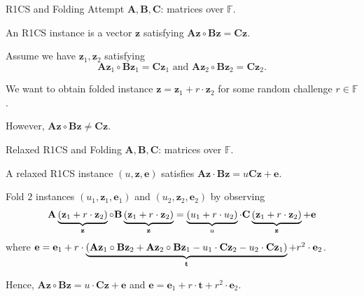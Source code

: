 \begin{frame}{R1CS and Folding Attempt}
	$\mathbf{A}, \mathbf{B}, \mathbf{C}$: matrices over $\mathbb{F}$.
	
	An R1CS instance is a vector $\mathbf{z}$ satisfying $\mathbf{A}\mathbf{z}\circ\mathbf{B}\mathbf{z} = \mathbf{C}\mathbf{z}$.
	
	Assume we have $\mathbf{z}_1, \mathbf{z}_2$ satisfying $$\mathbf{A}\mathbf{z}_1\circ\mathbf{B}\mathbf{z}_1 = \mathbf{C}\mathbf{z}_1 \text{ and } \mathbf{A}\mathbf{z}_2\circ\mathbf{B}\mathbf{z}_2 = \mathbf{C}\mathbf{z}_2.$$
	
	We want to obtain folded instance $\mathbf{z} = \mathbf{z}_1 + r\cdot\mathbf{z}_2$ for some random challenge $r \in \mathbb{F}$.
	
	However, $\mathbf{A}\mathbf{z}\circ \mathbf{B}\mathbf{z} \not= \mathbf{C}\mathbf{z}$.
\end{frame}

\begin{frame}{Relaxed R1CS and Folding}
	$\mathbf{A}, \mathbf{B}, \mathbf{C}$: matrices over $\mathbb{F}$.
	
	A relaxed R1CS instance $(u, \mathbf{z}, \mathbf{e})$ satisfies $\mathbf{A}\mathbf{z}\cdot \mathbf{B}\mathbf{z} = u\mathbf{C}\mathbf{z} + \mathbf{e}$. 
	
	Fold $2$ instances $(u_1, \mathbf{z}_1, \mathbf{e}_1)$ and $(u_2, \mathbf{z}_2, \mathbf{e}_2)$ by observing
	\begin{equation*}
		\begin{aligned}
			\mathbf{A}\underbrace{(\mathbf{z}_1 + r\cdot \mathbf{z}_2)}_{\mathbf{z}} \circ\mathbf{B}\underbrace{(\mathbf{z}_1 + r\cdot \mathbf{z}_2)}_{\mathbf{z}} = \underbrace{(u_1 + r\cdot u_2)}_{u}\cdot\mathbf{C}\underbrace{(\mathbf{z}_1 + r\cdot \mathbf{z}_2)}_{\mathbf{z}} + \mathbf{e}
		\end{aligned}
	\end{equation*}
	where $\mathbf{e} = \mathbf{e}_1 + r\cdot \underbrace{(\mathbf{A}\mathbf{z}_1\circ\mathbf{B}\mathbf{z}_2 + \mathbf{A}\mathbf{z}_2 \circ\mathbf{B}\mathbf{z}_1 - u_1\cdot\mathbf{C}\mathbf{z}_2 - u_2\cdot\mathbf{C}\mathbf{z}_1)}_{\mathbf{t}} + r^2\cdot\mathbf{e}_2$.
	
	Hence, $\mathbf{A}\mathbf{z}\circ\mathbf{B}\mathbf{z} = u\cdot \mathbf{C}\mathbf{z} + \mathbf{e}$ and $\mathbf{e} = \mathbf{e}_1 + r\cdot\mathbf{t} + r^2\cdot\mathbf{e}_2$.
\end{frame}

